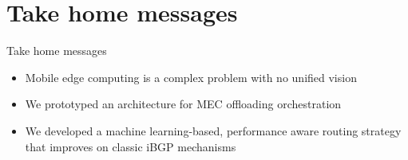 \documentclass{beamer}
\begin{document}
\section*{Take home messages}
\begin{frame}{Take home messages}
\begin{itemize}
\item	Mobile edge computing is a complex problem with no unified vision\\
\item	We prototyped an architecture for MEC offloading orchestration\\
\item	We developed a machine learning-based, performance aware routing strategy that improves on classic iBGP mechanisms
\end{itemize}	
	\end{frame}  
\frame{\titlepage}
\end{document}

